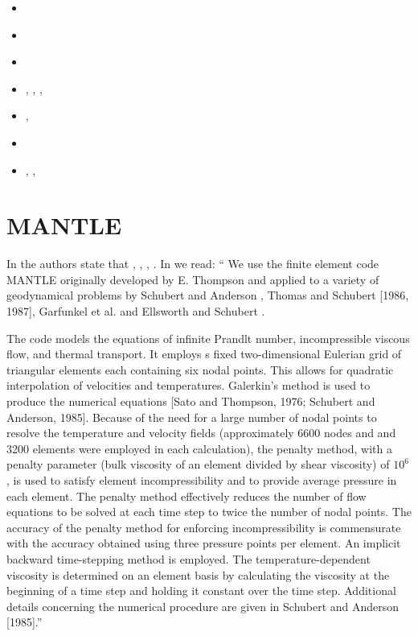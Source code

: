 \begin{small}
\begin{itemize}
\item[\twothousandnine]        \textcite{saus09}
\item[\twothousandseventeen]   \textcite{sace17}
\item[\twothousandtwentyone]   \textcite{sasa21}
\item[\twothousandtwentytwo]   \textcite{saap22}, \textcite{sisa22}, 
                               \textcite{saap22}, \textcite{saup22}
\item[\twothousandtwentythree] \textcite{sisd23}, \textcite{sasa23b}
\item[\twothousandtwentyfour]  \textcite{basf24}
\item[\twothousandtwentyfive]  \textcite{doss25b}, \textcite{sisg25}, \textcite{dosa25}
\end{itemize}
\end{small} 

\section{MANTLE}

In \cite{scag95} the authors state that 
\cite{scan85}, \cite{elsc88}, \cite{scoa89}, 
\cite{olsa88} \cite{olsa93}.
In \cite{olsa88} we read: ``
We use the finite element code MANTLE originally
developed by E. Thompson \cite{thll69,thha73,thom75,dath78}
and applied to a variety
of geodynamical problems by Schubert and Anderson \cite{scan85},
Thomas and Schubert [1986, 1987],
Garfunkel et al. \cite{gaas86} and Ellsworth and Schubert \cite{elsc88}.

The code models
the equations of infinite Prandlt number, incompressible
viscous flow, and thermal transport.
It employs s fixed two-dimensional Eulerian grid
of triangular elements each containing six nodal points.
This allows for quadratic interpolation
of velocities and temperatures.
Galerkin's method is used to produce the numerical
equations [Sato and Thompson, 1976; Schubert and Anderson, 1985].
Because of the need for a large number of nodal points to resolve the 
temperature and velocity fields (approximately 6600 nodes
and and 3200 elements were employed in each
calculation), the penalty method, with a penalty
parameter (bulk viscosity of an element divided
by shear viscosity) of $10^6$, is used to satisfy
element incompressibility and to provide
average pressure in each element.
The penalty method effectively reduces the number of flow
equations to be solved at each time step to twice the number of nodal points.
The accuracy of the penalty method for enforcing incompressibility
is commensurate with the accuracy obtained using three pressure points per
element. An implicit backward time-stepping method is employed.
The temperature-dependent viscosity is determined on an element basis by
calculating the viscosity at the beginning of a time step and holding 
it constant over the time step. Additional details concerning the numerical 
procedure are given in Schubert and Anderson [1985].''

